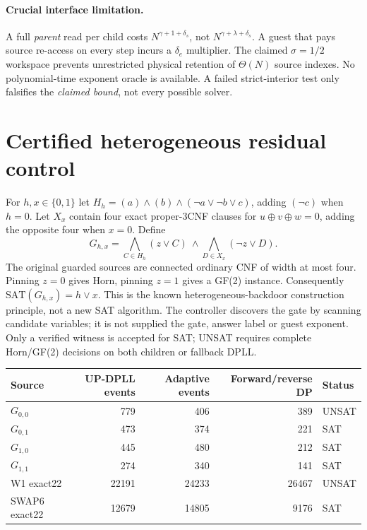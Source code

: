 \documentclass[11pt]{article}
\begin{document}
\paragraph{Crucial interface limitation.}
A full \emph{parent} read per child costs $N^{\gamma+1+\delta_s}$, not
$N^{\gamma+\lambda+\delta_s}$. A guest that pays source re-access on every
step incurs a $\delta_e$ multiplier. The claimed $\sigma=1/2$ workspace
prevents unrestricted physical retention of $\Theta(N)$ source indexes.
No polynomial-time exponent oracle is available. A failed strict-interior
test only falsifies the \emph{claimed bound}, not every possible solver.

\section{Certified heterogeneous residual control}
For $h,x\in\{0,1\}$ let
$H_h=(a)\wedge(b)\wedge(\neg a\vee\neg b\vee c)$,
adding $(\neg c)$ when $h=0$.
Let $X_x$ contain four exact proper-3CNF clauses for
$u\oplus v\oplus w=0$, adding the opposite four when $x=0$.
Define
\[
 G_{h,x}=\bigwedge_{C\in H_h}(z\vee C)
 \ \wedge\bigwedge_{D\in X_x}(\neg z\vee D).
\]
The original guarded sources are connected ordinary CNF of width at most
four. Pinning $z=0$ gives Horn, pinning $z=1$ gives a GF(2) instance.
Consequently $\mathrm{SAT}(G_{h,x})=h\lor x$.
This is the known heterogeneous-backdoor construction principle, not a
new SAT algorithm. The controller discovers the gate by scanning
candidate variables; it is not supplied the gate, answer label or
guest exponent. Only a verified witness is accepted for SAT; UNSAT
requires complete Horn/GF(2) decisions on both children or fallback DPLL.

\begin{center}\small
\begin{tabular}{lrrrl}
\toprule Source&UP-DPLL events&Adaptive events&Forward/reverse DP&Status\\\midrule
$G_{0,0}$&779&406&389&UNSAT\\
$G_{0,1}$&473&374&221&SAT\\
$G_{1,0}$&445&480&212&SAT\\
$G_{1,1}$&274&340&141&SAT\\
W1 exact22&22191&24233&26467&UNSAT\\
SWAP6 exact22&12679&14805&9176&SAT\\\bottomrule
\end{tabular}
\end{center}
\end{document}
